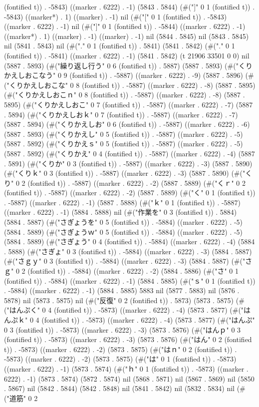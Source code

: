 (fontified t)) . -5843) ((marker . 6222) . -1) (5843 . 5844) (#("]" 0 1 (fontified t)) . -5843) ((marker*) . 1) ((marker) . -1) nil (#("[" 0 1 (fontified t)) . -5843) ((marker . 6222) . -1) nil (#("]" 0 1 (fontified t)) . -5844) ((marker . 6222) . -1) ((marker*) . 1) ((marker) . -1) ((marker) . -1) nil (5844 . 5845) nil (5843 . 5845) nil (5841 . 5843) nil (#("." 0 1 (fontified t)) . 5841) (5841 . 5842) (#("." 0 1 (fontified t)) . -5841) ((marker . 6222) . -1) (5841 . 5842) (t 21906 33501 0 0) nil (5887 . 5893) (#("繰り返し行う" 0 6 (fontified t)) . 5887) (5887 . 5893) (#("くりかえしおこなう" 0 9 (fontified t)) . -5887) ((marker . 6222) . -9) (5887 . 5896) (#("くりかえしおこな" 0 8 (fontified t)) . -5887) ((marker . 6222) . -8) (5887 . 5895) (#("くりかえしおこｎ" 0 8 (fontified t)) . -5887) ((marker . 6222) . -8) (5887 . 5895) (#("くりかえしおこ" 0 7 (fontified t)) . -5887) ((marker . 6222) . -7) (5887 . 5894) (#("くりかえしおｋ" 0 7 (fontified t)) . -5887) ((marker . 6222) . -7) (5887 . 5894) (#("くりかえしお" 0 6 (fontified t)) . -5887) ((marker . 6222) . -6) (5887 . 5893) (#("くりかえし" 0 5 (fontified t)) . -5887) ((marker . 6222) . -5) (5887 . 5892) (#("くりかえｓ" 0 5 (fontified t)) . -5887) ((marker . 6222) . -5) (5887 . 5892) (#("くりかえ" 0 4 (fontified t)) . -5887) ((marker . 6222) . -4) (5887 . 5891) (#("くりか" 0 3 (fontified t)) . -5887) ((marker . 6222) . -3) (5887 . 5890) (#("くりｋ" 0 3 (fontified t)) . -5887) ((marker . 6222) . -3) (5887 . 5890) (#("くり" 0 2 (fontified t)) . -5887) ((marker . 6222) . -2) (5887 . 5889) (#("くｒ" 0 2 (fontified t)) . -5887) ((marker . 6222) . -2) (5887 . 5889) (#("く" 0 1 (fontified t)) . -5887) ((marker . 6222) . -1) (5887 . 5888) (#("ｋ" 0 1 (fontified t)) . -5887) ((marker . 6222) . -1) (5884 . 5888) nil (#("作業を" 0 3 (fontified t)) . 5884) (5884 . 5887) (#("さぎょうを" 0 5 (fontified t)) . -5884) ((marker . 6222) . -5) (5884 . 5889) (#("さぎょうｗ" 0 5 (fontified t)) . -5884) ((marker . 6222) . -5) (5884 . 5889) (#("さぎょう" 0 4 (fontified t)) . -5884) ((marker . 6222) . -4) (5884 . 5888) (#("さぎょ" 0 3 (fontified t)) . -5884) ((marker . 6222) . -3) (5884 . 5887) (#("さｇｙ" 0 3 (fontified t)) . -5884) ((marker . 6222) . -3) (5884 . 5887) (#("さｇ" 0 2 (fontified t)) . -5884) ((marker . 6222) . -2) (5884 . 5886) (#("さ" 0 1 (fontified t)) . -5884) ((marker . 6222) . -1) (5884 . 5885) (#("ｓ" 0 1 (fontified t)) . -5884) ((marker . 6222) . -1) (5884 . 5885) 5883 nil (5877 . 5883) nil (5876 . 5878) nil (5873 . 5875) nil (#("反復" 0 2 (fontified t)) . 5873) (5873 . 5875) (#("はんぷく" 0 4 (fontified t)) . -5873) ((marker . 6222) . -4) (5873 . 5877) (#("はんぷｋ" 0 4 (fontified t)) . -5873) ((marker . 6222) . -4) (5873 . 5877) (#("はんぷ" 0 3 (fontified t)) . -5873) ((marker . 6222) . -3) (5873 . 5876) (#("はんｐ" 0 3 (fontified t)) . -5873) ((marker . 6222) . -3) (5873 . 5876) (#("はん" 0 2 (fontified t)) . -5873) ((marker . 6222) . -2) (5873 . 5875) (#("はｎ" 0 2 (fontified t)) . -5873) ((marker . 6222) . -2) (5873 . 5875) (#("は" 0 1 (fontified t)) . -5873) ((marker . 6222) . -1) (5873 . 5874) (#("ｈ" 0 1 (fontified t)) . -5873) ((marker . 6222) . -1) (5873 . 5874) (5872 . 5874) nil (5868 . 5871) nil (5867 . 5869) nil (5850 . 5867) nil (5842 . 5844) (5842 . 5848) nil (5841 . 5842) nil (5832 . 5834) nil (#("道筋" 0 2 
